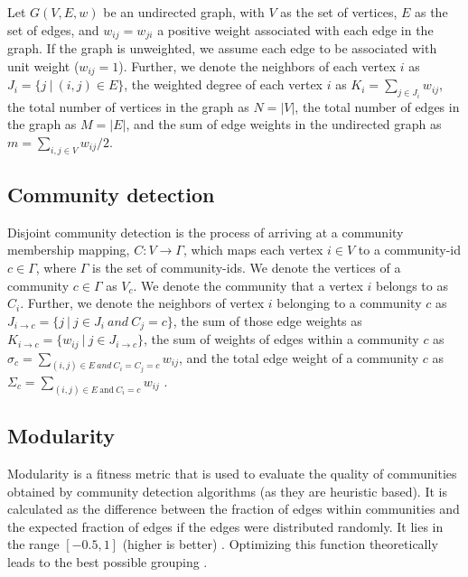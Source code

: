 Let $G(V, E, w)$ be an undirected graph, with $V$ as the set of vertices, $E$ as the set of edges, and $w_{ij} = w_{ji}$ a positive weight associated with each edge in the graph. If the graph is unweighted, we assume each edge to be associated with unit weight ($w_{ij} = 1$). Further, we denote the neighbors of each vertex $i$ as $J_i = \{j\ |\ (i, j) \in E\}$, the weighted degree of each vertex $i$ as $K_i = \sum_{j \in J_i} w_{ij}$, the total number of vertices in the graph as $N = |V|$, the total number of edges in the graph as $M = |E|$, and the sum of edge weights in the undirected graph as $m = \sum_{i, j \in V} w_{ij}/2$.




\subsection{Community detection}

Disjoint community detection is the process of arriving at a community membership mapping, $C: V \rightarrow \Gamma$, which maps each vertex $i \in V$ to a community-id $c \in \Gamma$, where $\Gamma$ is the set of community-ids. We denote the vertices of a community $c \in \Gamma$ as $V_c$. We denote the community that a vertex $i$ belongs to as $C_i$. Further, we denote the neighbors of vertex $i$ belonging to a community $c$ as $J_{i \rightarrow c} = \{j\ |\ j \in J_i\ and\ C_j = c\}$, the sum of those edge weights as $K_{i \rightarrow c} = \{w_{ij}\ |\ j \in J_{i \rightarrow c}\}$, the sum of weights of edges within a community $c$ as $\sigma_c = \sum_{(i, j) \in E\ and\ C_i = C_j = c} w_{ij}$, and the total edge weight of a community $c$ as $\Sigma_c = \sum_{(i, j) \in E\ \mbox{and}\ C_i = c} w_{ij}$ \cite{com-zarayeneh21, com-leskovec21}.




\subsection{Modularity}

Modularity is a fitness metric that is used to evaluate the quality of communities obtained by community detection algorithms (as they are heuristic based). It is calculated as the difference between the fraction of edges within communities and the expected fraction of edges if the edges were distributed randomly. It lies in the range $[-0.5, 1]$ (higher is better) \cite{com-brandes07}. Optimizing this function theoretically leads to the best possible grouping \cite{com-newman04, com-traag11}.


